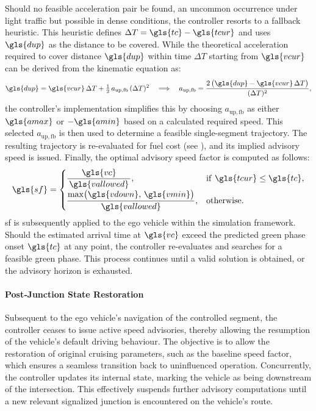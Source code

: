 \mynewline
Should no feasible acceleration pair be found, an uncommon occurrence under light traffic but possible in dense conditions, the controller resorts to a fallback heuristic. This heuristic defines $\Delta T = \gls{tc} - \gls{tcur}$ and uses $\gls{dup}$ as the distance to be covered. While the theoretical acceleration required to cover distance $\gls{dup}$ within time $\Delta T$ starting from $\gls{vcur}$ can be derived from the kinematic equation as:
\begin{equation}
   \gls{dup} = \gls{vcur}\,\Delta T + \tfrac{1}{2}\,a_{\mathrm{up,fb}}\,(\Delta T)^2
   \quad\Longrightarrow\quad
   a_{\mathrm{up,fb}} = \frac{2\,\bigl(\gls{dup} - \gls{vcur}\,\Delta T\bigr)}{(\Delta T)^2},
\end{equation}
the controller's implementation simplifies this by choosing $a_{\mathrm{up,fb}}$ as either $\gls{amax}$ or $-\gls{amin}$ based on a calculated required speed. This selected $a_{\mathrm{up,fb}}$ is then used to determine a feasible single-segment trajectory. The resulting trajectory is re-evaluated for fuel cost (see ), and its implied advisory speed is issued.
\mynewline
Finally, the optimal advisory speed factor is computed as follows:
\begin{equation}
\gls{sf} =
\begin{cases}
\dfrac{\gls{vc}}{\,\gls{vallowed}\,},
& \text{if } \gls{tcur} \leq \gls{tc}, \\[6pt]
\dfrac{\max\bigl(\gls{vdown},\,\gls{vmin}\bigr)}{\,\gls{vallowed}\,},
& \text{otherwise}.
\end{cases}
\end{equation}
\gls{sf} is subsequently applied to the ego vehicle within the simulation framework. Should the estimated arrival time at $\gls{vc}$ exceed the predicted green phase onset $\gls{tc}$ at any point, the controller re-evaluates and searches for a feasible green phase. This process continues until a valid solution is obtained, or the advisory horizon is exhausted.

\paragraph{Post‐Junction State Restoration}
Subsequent to the ego vehicle's navigation of the controlled segment, the controller ceases to issue active speed advisories, thereby allowing the resumption of the vehicle's default driving behaviour. The objective is to allow the restoration of original cruising parameters, such as the baseline speed factor, which ensures a seamless transition back to uninfluenced operation. Concurrently, the controller updates its internal state, marking the vehicle as being downstream of the intersection. This effectively suspends further advisory computations until a new relevant signalized junction is encountered on the vehicle's route.

